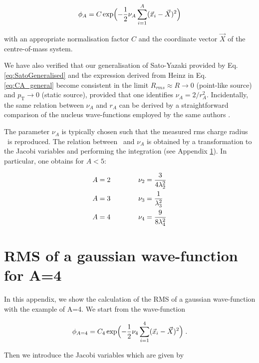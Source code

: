 \documentclass[a4paper,11pt]{scrartcl} %
\begin{document}
\begin{appendix}
\begin{equation}\label{eq:SatoWave}
 \phi_{A} = C \exp\Bigl(-{1\over2} \nu_{A} \sum_{i=1}^{A}(\vec{x}_{i} - \vec{X})^2 \Bigr)
\end{equation}

\noindent with an appropriate normalisation factor $C$ and the coordinate vector $\vec{X}$ of the centre-of-mass system. 
 
We have also verified that our generalisation of Sato-Yazaki provided by Eq. \ref{eq:SatoGeneralised} and the expression derived from Heinz in Eq. \ref{eq:CA_general} become consistent in the limit $R_{rms} \approx R \rightarrow 0$ (point-like source) and $p_{\mathrm{T}} \rightarrow 0$ (static source), provided that one identifies $\nu_{A} = {2 / r_{A}^{2}}$. Incidentally, the same relation between $\nu_{A}$ and $r_{A}$ can be derived by a straightforward comparison of the nucleus wave-functions employed by the same authors \cite{Scheibl:1998tk,Sato:1981ez}. 

The parameter $\nu_{A}$ is typically chosen such that the measured rms charge radius \rmsradius~is reproduced. The relation between \rmsradius~and $\nu_{A}$ is obtained by a transformation to the Jacobi variables and performing the integration (see Appendix \ref{appendix:integration}). In particular, one obtains for $A < 5$:

\begin{align}
	A& = 2 \qquad \qquad \nu_{2} = {3 \over {4\ensuremath{\lambda_{2}}^2}}  \\
	A& = 3 \qquad \qquad \nu_{3} = {1 \over {\ensuremath{\lambda_{3}}^2}} \\
	A& = 4 \qquad \qquad \nu_{4} =  {9 \over {8\ensuremath{\lambda_{4}}^2}}
\end{align}


%
%
\section{RMS of a gaussian wave-function for A=4 }\label{appendix:integration}

In this appendix, we show the calculation of the RMS of a gaussian wave-function with the example of A=4. We start from the wave-function

\begin{equation}\label{eq:SatoWave}
 \phi_{A=4} = C_{4} \exp\Bigl(-{1\over2} \nu_{4} \sum_{i=1}^{4}(\vec{x}_{i} - \vec{X})^2 \Bigr) \; .
\end{equation}

\noindent Then we introduce the Jacobi variables which are given by %


\end{appendix}
\end{document}

